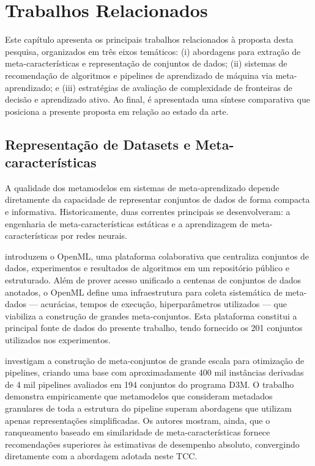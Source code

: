 \chapter{Trabalhos Relacionados}\label{cap:trabalhosRelacionados}

Este capítulo apresenta os principais trabalhos relacionados à proposta desta pesquisa, organizados em três eixos temáticos: (i) abordagens para extração de meta-características e representação de conjuntos de dados; (ii) sistemas de recomendação de algoritmos e pipelines de aprendizado de máquina via meta-aprendizado; e (iii) estratégias de avaliação de complexidade de fronteiras de decisão e aprendizado ativo. Ao final, é apresentada uma síntese comparativa que posiciona a presente proposta em relação ao estado da arte.

\section{Representação de Datasets e Meta-características}
\label{sec:relMetaFeatures}

A qualidade dos metamodelos em sistemas de meta-aprendizado depende diretamente da capacidade de representar conjuntos de dados de forma compacta e informativa. Historicamente, duas correntes principais se desenvolveram: a engenharia de meta-características estáticas e a aprendizagem de meta-características por redes neurais.

 introduzem o OpenML, uma plataforma colaborativa que centraliza conjuntos de dados, experimentos e resultados de algoritmos em um repositório público e estruturado. Além de prover acesso unificado a centenas de conjuntos de dados anotados, o OpenML define uma infraestrutura para coleta sistemática de meta-dados — acurácias, tempos de execução, hiperparâmetros utilizados — que viabiliza a construção de grandes meta-conjuntos. Esta plataforma constitui a principal fonte de dados do presente trabalho, tendo fornecido os 201 conjuntos utilizados nos experimentos.

 investigam a construção de meta-conjuntos de grande escala para otimização de pipelines, criando uma base com aproximadamente 400 mil instâncias derivadas de 4 mil pipelines avaliados em 194 conjuntos do programa D3M. O trabalho demonstra empiricamente que metamodelos que consideram metadados granulares de toda a estrutura do pipeline superam abordagens que utilizam apenas representações simplificadas. Os autores mostram, ainda, que o ranqueamento baseado em similaridade de meta-características fornece recomendações superiores às estimativas de desempenho absoluto, convergindo diretamente com a abordagem adotada neste TCC.

